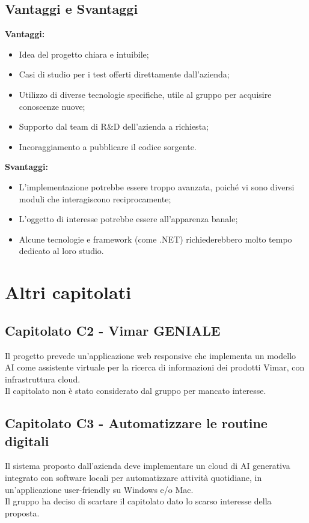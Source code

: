 \documentclass[10pt]{article}
\begin{document}
    \subsection{Vantaggi e Svantaggi}
    \textbf{Vantaggi:}
    \begin{itemize}
        \item Idea del progetto chiara e intuibile;
        \item Casi di studio per i test offerti direttamente dall'azienda;
        \item Utilizzo di diverse tecnologie specifiche, utile al gruppo per acquisire conoscenze nuove;
        \item Supporto dal team di R\&D dell'azienda a richiesta;
        \item Incoraggiamento a pubblicare il codice sorgente.
    \end{itemize}
    \textbf{Svantaggi:}
    \begin{itemize}
        \item L'implementazione potrebbe essere troppo avanzata, poiché vi sono diversi moduli che interagiscono reciprocamente;
        \item L'oggetto di interesse potrebbe essere all'apparenza banale;
        \item Alcune tecnologie e framework (come .NET) richiederebbero molto tempo dedicato al loro studio.
    \end{itemize}
    
    
    \section{Altri capitolati}
    \subsection{Capitolato C2 - Vimar GENIALE}
    Il progetto prevede un'applicazione web responsive che implementa un modello AI come
    assistente virtuale per la ricerca di informazioni dei prodotti Vimar, con infrastruttura cloud.\\
    Il capitolato non è stato considerato dal gruppo per mancato interesse.
    
    \subsection{Capitolato C3 - Automatizzare le routine digitali}
    Il sistema proposto dall'azienda deve implementare un cloud di AI generativa integrato con software locali
    per automatizzare attività quotidiane, in un'applicazione user-friendly su Windows e/o Mac.\\
    Il gruppo ha deciso di scartare il capitolato dato lo scarso interesse della proposta.
    
\end{document}
